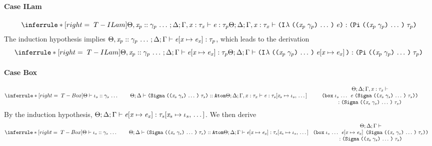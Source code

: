 \begin{sproof}
  \paragraph{Case {\sc ILam}}
  \[{\infr[T-ILam]
    {\typeof{\sEnv, \sequence{\hassort{\var_p}{\sort_p}}}{\kEnv}{\tEnv, \hastype{\var}{\type_{\var}}}
      {\expr}
      {\type_p}}
    {\typeof{\sEnv}{\kEnv}{\tEnv, \hastype{\var}{\type_{\var}}}
      {\ilam{\sequence{\notevar{\var_p}{\sort_p}}}{\expr}}
      {\typedprod{\sequence{\notevar{\var_p}{\sort_p}}}{\type_p}}}}\]
  The induction hypothesis implies
  $\Theta, \mathit{x}_p :: \mathit{\gamma}_p \, \ldots \,;\Delta;\Gamma \vdash \mathit{e}\hspace{-2pt}\left[ \mathit{x} \mapsto \mathit{e}_{\mathit{x}} \right] : \mathit{\tau}_p$,
      which leads to the derivation
  \[{\infr[T-ILam]
    {\typeof{\sEnv, \sequence{\hassort{\var_p}{\sort_p}}}{\kEnv}{\tEnv}
      {\exprsubst{\expr}}
      {\type_p}}
    {\typeof{\sEnv}{\kEnv}{\tEnv}
      {\ilam{\sequence{\notevar{\var_p}{\sort_p}}}{\exprsubst{\expr}}}
      {\typedprod{\sequence{\notevar{\var_p}{\sort_p}}}{\type_p}}}}\]
  \paragraph{Case {\sc Box}}
  \[{\infr[T-Box]
    {\sequence{\sortof{\sEnv}{\idx_s}{\sort_s}}
      \qquad
      {\kindof{\sEnv}{\kEnv}
        {\typedsum{\sequence{\notevar{\var_s}{\sort_s}}}{\type_s}}
        {\kindatom}}
      \\
      {\typeof{\sEnv}{\kEnv}{\tEnv, \hastype{\var}{\type_{\var}}}
        {\expr}
        {\seqsubst{\type_s}{\var_s}{\idx_s}}}}
    {\parbox{0.67\textwidth}
      {\centering
        \({\sEnv};{\kEnv};{\tEnv, \hastype{\var}{\type_{\var}}}\vdash\)
        \({\dsum
          {\sequence{\idx_s}}{\expr}
          {\typedsum{\sequence{\notevar{\var_s}{\sort_s}}}{\type_s}}}\)\\
        \(:{\typedsum{\sequence{\notevar{\var_s}{\sort_s}}}{\type_s}}\)}}}\]
  By the induction hypothesis,
  $\Theta;\Delta;\Gamma \vdash \mathit{e}\hspace{-2pt}\left[ \mathit{x} \mapsto \mathit{e}_{\mathit{x}} \right] : \mathit{\tau}_s\hspace{-2pt}\left[ \mathit{x}_s \mapsto \mathit{\iota}_s, \, \ldots \, \right]$.
  We then derive
  \[{\infr[T-Box]
    {\sequence{\sortof{\sEnv}{\idx_s}{\sort_s}}
      \qquad
      {\kindof{\sEnv}{\kEnv}
        {\typedsum{\sequence{\notevar{\var_s}{\sort_s}}}{\type_s}}
        {\kindatom}}
      \\
      {\typeof{\sEnv}{\kEnv}{\tEnv}
        {\exprsubst{\expr}}
        {\seqsubst{\type_s}{\var_s}{\idx_s}}}}
    {\parbox{0.67\textwidth}
      {\centering
        \({\sEnv};{\kEnv};{\tEnv}\vdash\)
        \({\dsum
          {\sequence{\idx_s}}{\exprsubst{\expr}}
          {\typedsum{\sequence{\notevar{\var_s}{\sort_s}}}{\type_s}}}\)\\
        \(:{\typedsum{\sequence{\notevar{\var_s}{\sort_s}}}{\type_s}}\)}}}\]

\end{sproof}
